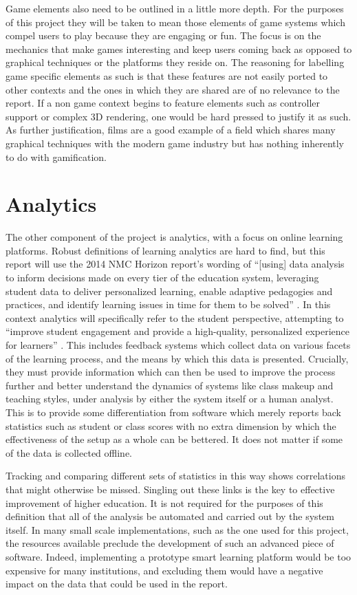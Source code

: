 \documentclass[12pt,a4paper,twoside]{report}
\begin{document}
Game elements also need to be outlined in a little more depth. For the purposes of this project they will be taken to mean those elements of game systems which compel users to play because they are engaging or fun. The focus is on the mechanics that make games interesting and keep users coming back as opposed to graphical techniques or the platforms they reside on. The reasoning for labelling game specific elements as such is that these features are not easily ported to other contexts and the ones in which they are shared are of no relevance to the report. If a non game context begins to feature elements such as controller support or complex 3D rendering, one would be hard pressed to justify it as such. As further justification, films are a good example of a field which shares many graphical techniques with the modern game industry but has nothing inherently to do with gamification.

\section{Analytics}
The other component of the project is analytics, with a focus on online learning platforms. Robust definitions of learning analytics are hard to find, but this report will use the 2014 NMC Horizon report's wording of ``[using] data analysis to inform decisions made on every tier of the education system, leveraging student data to deliver personalized learning, enable adaptive pedagogies and practices, and identify learning issues in time for them to be solved'' \cite{johnson2014nmc}. In this context analytics will specifically refer to the student perspective, attempting to ``improve student engagement and provide a high-quality, personalized experience for learners'' \cite{johnson2014nmc}. This includes feedback systems which collect data on various facets of the learning process, and the means by which this data is presented. Crucially, they must provide information which can then be used to improve the process further and better understand the dynamics of systems like class makeup and teaching styles, under analysis by either the system itself or a human analyst. This is to provide some differentiation from software which merely reports back statistics such as student or class scores with no extra dimension by which the effectiveness of the setup as a whole can be bettered. It does not matter if some of the data is collected offline.

Tracking and comparing different sets of statistics in this way shows correlations that might otherwise be missed. Singling out these links is the key to effective improvement of higher education. It is not required for the purposes of this definition that all of the analysis be automated and carried out by the system itself. In many small scale implementations, such as the one used for this project, the resources available preclude the development of such an advanced piece of software. Indeed, implementing a prototype smart learning platform would be too expensive for many institutions, and excluding them would have a negative impact on the data that could be used in the report.
\end{document}

